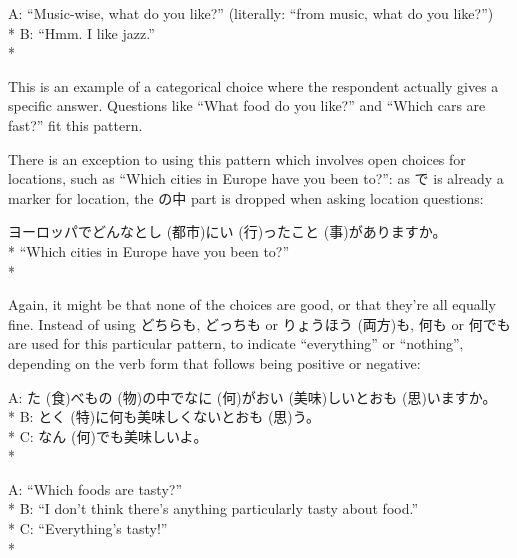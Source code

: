 \documentclass[11pt, b5paper, twoside, openright, onecolumn]{book}
\makeatletter
\newcommand*{\rubystack}[2]{{\relscale{0.5}%
  \begin{tabular}[b]{@{}c@{}}%
    {#1}\\%
   {\textscale{2}{#2}}%
  \end{tabular}}%
}
\DeclareRobustCommand*{\ruby}[2]{%
  \mbox{%
    \setlength{\parskip}{0ex}%
    \BeginAccSupp{method=pdfstringdef,ActualText={#1}}%
      \rubystack{\phantom{#2}}{#1}%
      \llap{%
        \rubystack{#2}{\phantom{#1}}%
      }%
    \EndAccSupp{}%
  }%
}
\renewcommand*{\ruby}[2]{#2 (#1)}%
\newenvironment{exampleblock}{
\setlength{\parindent}{0.6in}
\begin{minipage}[t]{\dimexpr\textwidth-\parindent}}
{\end{minipage}}
\makeatother
\begin{document}
\begin{exampleblock}
A: “Music-wise‚ what do you like?” (literally: “from music‚ what do you like?”) \\* 
B: “Hmm. I like jazz.” \\* 
\end{exampleblock}
\vspace{0.2cm}

This is an example of a categorical choice where the respondent actually gives a specific answer. Questions like “What food do you like?” and “Which cars are fast?” fit this pattern.

There is an exception to using this pattern which involves open choices for locations‚ such as “Which cities in Europe have you been to?”: as で is already a marker for location‚ the の中 part is dropped when asking location questions:

\vspace{0.4cm}
\begin{exampleblock}
ヨーロッパでどんな\ruby{都市}{とし}に\ruby{行}{い}った\ruby{事}{こと}がありますか。 \\* 
“Which cities in Europe have you been to?” \\* 
\end{exampleblock}
\vspace{0.2cm}

Again‚ it might be that none of the choices are good‚ or that they’re all equally fine. Instead of using どちらも‚ どっちも or \ruby{両方}{りょうほう}も‚ 何も or 何でも are used for this particular pattern‚ to indicate “everything” or “nothing”‚ depending on the verb form that follows being positive or negative:

\vspace{0.4cm}
\begin{exampleblock}
A: \ruby{食}{た}べ\ruby{物}{もの}の中で\ruby{何}{なに}が\ruby{美味}{おい}しいと\ruby{思}{おも}いますか。 \\* 
B: \ruby{特}{とく}に何も美味しくないと\ruby{思}{おも}う。 \\* 
C: \ruby{何}{なん}でも美味しいよ。 \\* 
\end{exampleblock}
\vspace{0.2cm}

\begin{exampleblock}
A: “Which foods are tasty?” \\* 
B: “I don’t think there’s anything particularly tasty about food.” \\* 
C: “Everything’s tasty!” \\* 
\end{exampleblock}
\end{document}

